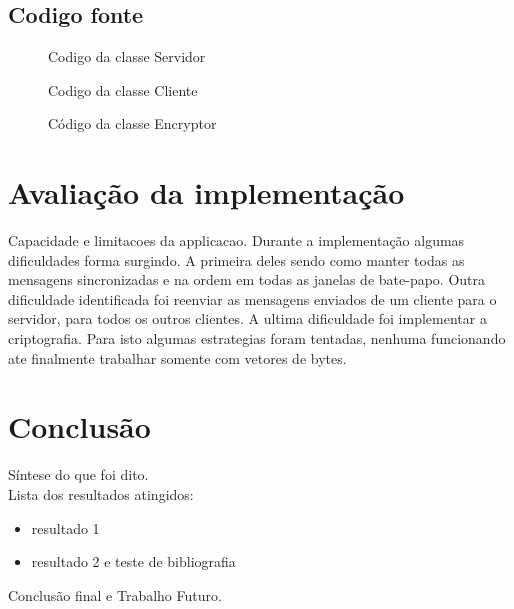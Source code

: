 \documentclass[a4paper,12pt]{article}
\begin{document}
\subsection{Codigo fonte}

\begin{figure}[H]

\caption{Codigo da classe Servidor}
\end{figure}

\begin{figure}[H]

\caption{Codigo da classe Cliente}
\end{figure}

\begin{figure}[H]

\caption{Código da classe Encryptor}
\end{figure}


\section{Avaliação da implementação}
Capacidade e limitacoes da applicacao.
Durante a implementação algumas dificuldades forma surgindo. A primeira deles sendo como manter todas as mensagens sincronizadas e na ordem em todas as janelas de bate-papo.
Outra dificuldade identificada foi reenviar as mensagens enviados de um cliente para o servidor, para todos os outros clientes.
A ultima dificuldade foi implementar a criptografia. Para isto algumas estrategias foram tentadas, nenhuma funcionando ate finalmente trabalhar somente com vetores de bytes.
\section{Conclusão}

Síntese do que foi dito.\\
Lista dos resultados atingidos:
\begin{itemize}
\item resultado 1
\item resultado 2 e teste de bibliografia \cite{Bulfinch1998}
\end{itemize}
Conclusão final e Trabalho Futuro.



\end{document}
